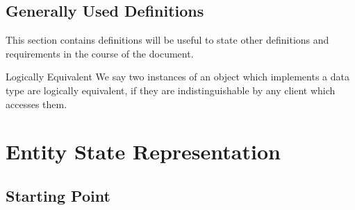 \documentclass[a4paper, 12pt]{book}
\begin{document}
\section{Generally Used Definitions}

This section contains definitions will be useful to state other definitions
and requirements in the course of the document. 

\begin{definition*}{Logically Equivalent}
  We say two instances of an object which implements a data type are
  logically equivalent, if they are indistinguishable by any client which
  accesses them.
\end{definition*}



\chapter{Entity State Representation}
\label{sec:entity-state-representation}


\section{Starting Point}
\label{sec:esr-goal}
\end{document}
